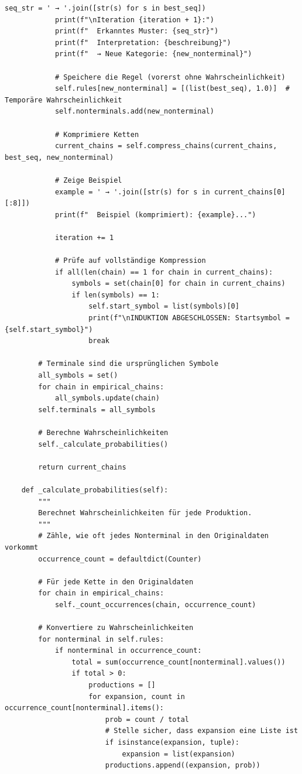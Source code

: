 \documentclass[
  12pt,
  a4paper,
  oneside,
  titlepage
]{article}
\begin{document}
\begin{lstlisting}[caption=Algorithmisch Rekursive Sequenzanalyse 3.0 - Hierarchische Grammatikinduktion]
            seq_str = ' → '.join([str(s) for s in best_seq])
            print(f"\nIteration {iteration + 1}:")
            print(f"  Erkanntes Muster: {seq_str}")
            print(f"  Interpretation: {beschreibung}")
            print(f"  → Neue Kategorie: {new_nonterminal}")
            
            # Speichere die Regel (vorerst ohne Wahrscheinlichkeit)
            self.rules[new_nonterminal] = [(list(best_seq), 1.0)]  # Temporäre Wahrscheinlichkeit
            self.nonterminals.add(new_nonterminal)
            
            # Komprimiere Ketten
            current_chains = self.compress_chains(current_chains, best_seq, new_nonterminal)
            
            # Zeige Beispiel
            example = ' → '.join([str(s) for s in current_chains[0][:8]])
            print(f"  Beispiel (komprimiert): {example}...")
            
            iteration += 1
            
            # Prüfe auf vollständige Kompression
            if all(len(chain) == 1 for chain in current_chains):
                symbols = set(chain[0] for chain in current_chains)
                if len(symbols) == 1:
                    self.start_symbol = list(symbols)[0]
                    print(f"\nINDUKTION ABGESCHLOSSEN: Startsymbol = {self.start_symbol}")
                    break
        
        # Terminale sind die ursprünglichen Symbole
        all_symbols = set()
        for chain in empirical_chains:
            all_symbols.update(chain)
        self.terminals = all_symbols
        
        # Berechne Wahrscheinlichkeiten
        self._calculate_probabilities()
        
        return current_chains
    
    def _calculate_probabilities(self):
        """
        Berechnet Wahrscheinlichkeiten für jede Produktion.
        """
        # Zähle, wie oft jedes Nonterminal in den Originaldaten vorkommt
        occurrence_count = defaultdict(Counter)
        
        # Für jede Kette in den Originaldaten
        for chain in empirical_chains:
            self._count_occurrences(chain, occurrence_count)
        
        # Konvertiere zu Wahrscheinlichkeiten
        for nonterminal in self.rules:
            if nonterminal in occurrence_count:
                total = sum(occurrence_count[nonterminal].values())
                if total > 0:
                    productions = []
                    for expansion, count in occurrence_count[nonterminal].items():
                        prob = count / total
                        # Stelle sicher, dass expansion eine Liste ist
                        if isinstance(expansion, tuple):
                            expansion = list(expansion)
                        productions.append((expansion, prob))
                    

\end{lstlisting}
\end{document}
